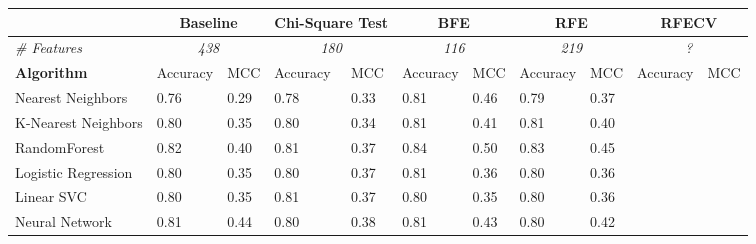 \begin{tabular}{l|ll|ll|ll|ll|ll}
& \multicolumn{2}{c|}{\textbf{Baseline}} & \multicolumn{2}{c|}{\textbf{Chi-Square Test}}  & \multicolumn{2}{c|}{\textbf{BFE}} & \multicolumn{2}{c|}{\textbf{RFE}}    & \multicolumn{2}{c}{\textbf{RFECV}} \\
\toprule
\textit{\# Features}& \multicolumn{2}{c|}{\textit{438}} & \multicolumn{2}{c|}{\textit{180}}  & \multicolumn{2}{c|}{\textit{116}} & \multicolumn{2}{c|}{\textit{219}}    & \multicolumn{2}{c}{\textit{?}} \\
\midrule
\textbf{Algorithm}                        & Accuracy  & MCC   & Accuracy  & MCC   & Accuracy  & MCC   & Accuracy  & MCC   & Accuracy  & MCC \\
\midrule                       
Nearest Neighbors       & 0.76      & 0.29  & 0.78      & 0.33  & 0.81      & 0.46  & 0.79      & 0.37  &&\\
K-Nearest Neighbors     & 0.80      & 0.35  & 0.80      & 0.34  & 0.81      & 0.41  & 0.81      & 0.40  &&\\
RandomForest            & 0.82      & 0.40  & 0.81      & 0.37  & 0.84      & 0.50  & 0.83      & 0.45  &&\\
Logistic Regression     & 0.80      & 0.35  & 0.80      & 0.37  & 0.81      & 0.36  & 0.80      & 0.36  &&\\
Linear SVC              & 0.80      & 0.35  & 0.81      & 0.37  & 0.80      & 0.35  & 0.80      & 0.36  &&\\
Neural Network          & 0.81      & 0.44  & 0.80      & 0.38  & 0.81      & 0.43  & 0.80      & 0.42  &&\\
\bottomrule
\end{tabular}
